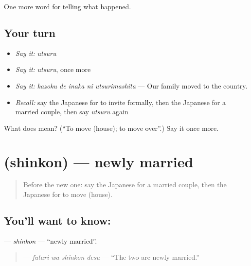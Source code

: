 \begin{grammarlens}[title={What you've built}]
One more word for telling what happened.
\end{grammarlens}

\subsection*{Your turn}
\begin{itemize}
\raggedright
  \item \emph{Say it:} \emph{utsuru}
  \item \emph{Say it:} \emph{utsuru}, once more
  \item \emph{Say it:} \emph{kazoku de inaka ni utsurimashita} — Our family moved to the country.
  \item \emph{Recall:} say the Japanese for to invite formally, then the Japanese for a married couple, then say \emph{utsuru} again
\end{itemize}

\begin{tcolorbox}[breakable,colback=teal!4,colframe=teal!35!black,title={Before you move on}]
What does  mean? (\textquotedblleft{}To move (house); to move over\textquotedblright{}.) Say it once more.
\end{tcolorbox}
\section[\texorpdfstring{\ja{しんこん} (shinkon)}{しんこん (shinkon)}]{ (shinkon) — newly married}

\label{lesson:JA-C290-shinkon}



\begin{quote}
Before the new one: say the Japanese for a married couple, then the Japanese for to move (house).
\end{quote}

\subsection*{You'll want to know: }
\textbf{} — \emph{shinkon} — \textquotedblleft{}newly married\textquotedblright{}.

\begin{quote}
\textbf{ } — \emph{futari wa shinkon desu} — \textquotedblleft{}The two are newly married.\textquotedblright{}
\end{quote}

